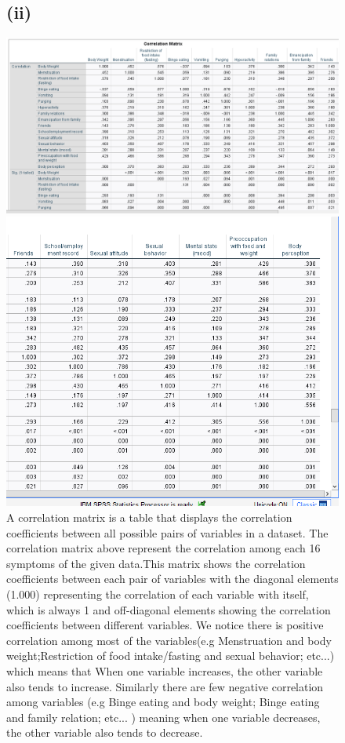 \documentclass[english,10pt,a4paper]{article}
\begin{document}

\begin{figure}
		\subsection*{(ii)}
	\includegraphics[width=1\linewidth]{correlation matrix1.png}
	\includegraphics[width=1\linewidth]{correlation matrix2.png}
A correlation matrix is a table that displays the correlation coefficients between all possible pairs of variables in a dataset. The correlation matrix above represent the correlation among each 16 symptoms of the given data.This matrix shows the correlation coefficients between each pair of variables with the diagonal elements (1.000) representing the correlation of each variable with itself, which is always 1 and off-diagonal elements showing the correlation coefficients between different variables. We notice there is positive correlation among most of the variables(e.g Menstruation and body weight;Restriction of food intake/fasting and sexual behavior; etc...) which means that When one variable increases, the other variable also tends to increase. Similarly there are few negative correlation among variables (e.g Binge eating and body weight; Binge eating and family relation; etc... )	meaning when one variable decreases, the other variable also tends to decrease. 


\end{figure}
\end{document}
